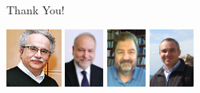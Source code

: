 \documentclass[12pt]{beamer}
\begin{document}
\section{}

\begin{frame}{Thank You!}

\def\picheight{0.75in}

\includegraphics[height=\picheight]{YGK}
\hfill
\includegraphics[height=\picheight]{PGD}
\includegraphics[height=\picheight]{AZP}
\includegraphics[height=\picheight]{SYS}

\end{frame}
\end{document}
